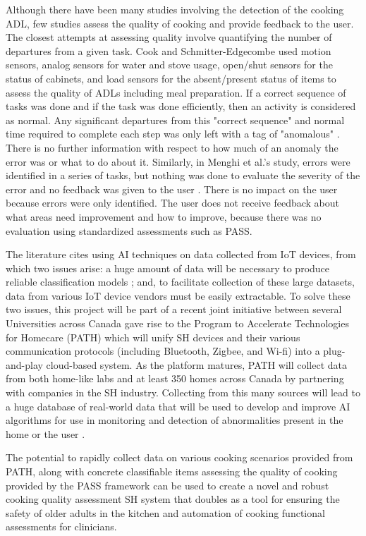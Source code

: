 Although there have been many studies involving the detection of the cooking ADL, few studies assess the quality of cooking and provide feedback to the user. The closest attempts at assessing quality involve quantifying the number of departures from a given task. Cook and Schmitter-Edgecombe used motion sensors, analog sensors for water and stove usage, open/shut sensors for the status of cabinets, and load sensors for the absent/present status of items to assess the quality of ADLs including meal preparation. If a correct sequence of tasks was done and if the task was done efficiently, then an activity is considered as normal. Any significant departures from this "correct sequence" and normal time required to complete each step was only left with a tag of "anomalous" \cite{cook_assessing_2009}. There is no further information with respect to how much of an anomaly the error was or what to do about it.  Similarly, in Menghi et al.'s study, errors were identified in a series of tasks, but nothing was done to evaluate the severity of the error and no feedback was given to the user \cite{mokhtari_smart_2018}. There is no impact on the user because errors were only identified. The user does not receive feedback about what areas need improvement and how to improve, because there was no evaluation using standardized assessments such as PASS.

The literature cites using AI techniques on data collected from IoT devices, from which two issues arise: a huge amount of data will be necessary to produce reliable classification models \cite{sarker_machine_2021}; and, to facilitate collection of these large datasets, data from various IoT device vendors must be easily extractable. To solve these two issues, this project will be part of a recent joint initiative between several Universities across Canada gave rise to the Program to Accelerate Technologies for Homecare (PATH) which will unify SH devices and their various communication protocols (including Bluetooth, Zigbee, and Wi-fi) into a plug-and-play cloud-based system. As the platform matures, PATH will collect data from both home-like labs and at least 350 homes across Canada by partnering with companies in the SH industry. Collecting from this many sources will lead to a huge database of real-world data that will be used to develop and improve AI algorithms for use in monitoring and detection of abnormalities present in the home or the user \cite{path_path_nodate}.

The potential to rapidly collect data on various cooking scenarios provided from PATH, along with concrete classifiable items assessing the quality of cooking provided by the PASS framework can be used to create a novel and robust cooking quality assessment SH system that doubles as a tool for ensuring the safety of older adults in the kitchen and automation of cooking functional assessments for clinicians.

